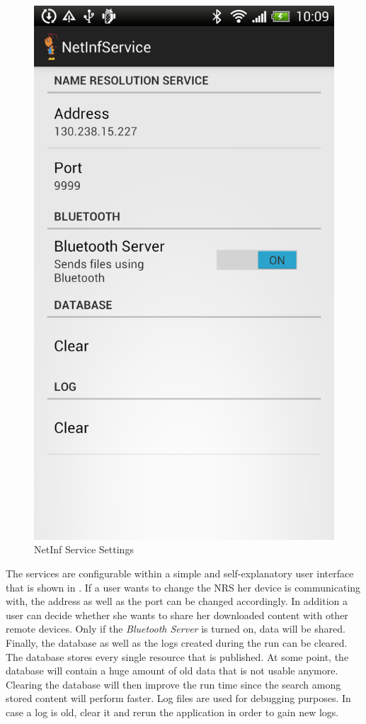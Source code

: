 \begin{figure}
\centering
\includegraphics[scale=0.29]{img/ant_settings.png}
\caption{NetInf Service Settings}\label{fig:servicesettings}
\end{figure}

The services are configurable within a simple and self-explanatory user interface that is shown in .
If a user wants to change the NRS her device is communicating with, the address as well as the port can be changed accordingly.
In addition a user can decide whether she wants to share her downloaded content with other remote devices. Only if the \textit{Bluetooth Server} 
is turned on, data will be shared.
Finally, the database as well as the logs created during the run can be cleared.
The database stores every single resource that is published. At some point, the database will contain a huge amount of old data that is not
usable anymore. Clearing the database will then improve the run time since the search among stored content will perform faster.
Log files are used for debugging purposes. In case a log is old, clear it and rerun the application in order to 
gain new logs.
